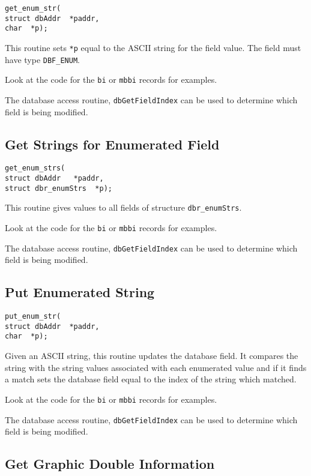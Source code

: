 \begin{verbatim}get_enum_str(
struct dbAddr  *paddr,
char  *p);
\end{verbatim}This routine sets \verb|*p| equal to the ASCII string for the field value. The field must have type \verb|DBF_ENUM|.

Look at the code for the \verb|bi| or \verb|mbbi| records for examples.

The database access routine, \verb|dbGetFieldIndex| can be used to determine which field is being modified.

\subsection{Get Strings for Enumerated Field}

\begin{verbatim}get_enum_strs(
struct dbAddr   *paddr,
struct dbr_enumStrs  *p);
\end{verbatim}This routine gives values to all fields of structure \verb|dbr_enumStrs|.

Look at the code for the \verb|bi| or \verb|mbbi| records for examples.

The database access routine, \verb|dbGetFieldIndex| can be used to determine which field is being modified.

\subsection{Put Enumerated String}

\begin{verbatim}put_enum_str(
struct dbAddr  *paddr,
char  *p);
\end{verbatim}Given an ASCII string, this routine updates the database field. It compares the string with the string values associated with 
each enumerated value and if it finds a match sets the database field equal to the index of the string which matched.

Look at the code for the \verb|bi| or \verb|mbbi| records for examples.

The database access routine, \verb|dbGetFieldIndex| can be used to determine which field is being modified.

\subsection{Get Graphic Double Information}

